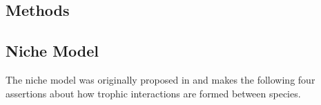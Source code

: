 \documentclass[/home/nkappler/Research/Dissertation/
 dissertation.tex]{subfiles}
\begin{document}
\begin{bibunit}
%
%

\section{Methods}

\subsection{Niche Model} 

The niche model was originally proposed in \cite{Williams2000} and makes the
following four assertions about how trophic interactions are formed between
species.


\end{bibunit}
\end{document}
